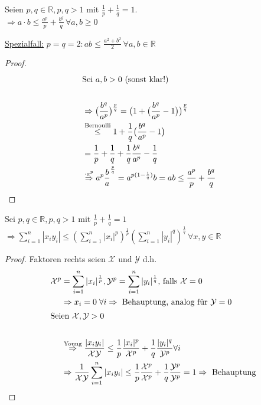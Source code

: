 \begin{proposition}
	Seien $p,q\in\mathbb{R}, p,q > 1$ mit $\frac{1}{p}+\frac{1}{q}=1$.\\
	$\Rightarrow a\cdot b \le \frac{a^p}{p} + \frac{b^q}{q}\,\forall a,b\ge 0$
	
	\uline{Spezialfall:} $p=q=2: ab \le \frac{a^2+b^2}{2} \,\forall a,b\in \mathbb{R}$
\end{proposition}
\begin{proof} %
	\begin{align*}
	\shortintertext{Sei $a,b > 0$ (sonst klar!)} \\
	&\Rightarrow \big(\frac{b^q}{a^p}\big)^{\frac{p}{q}} = \big(1+\big(\frac{b^q}{a^p} -1\big)\big)^{\frac{p}{q}}\\ 
	&\overset{\text{Bernoulli}}{\leq} 1+ \frac{1}{q}\big(\frac{b^q}{a^p} -1\big)\\ 
	&=\frac{1}{p}+\frac{1}{q}+\frac{1}{q}\frac{b^q}{a^p}-\frac{1}{q}\\
	&\overset{\cdot a^p}{\Rightarrow} a^p\frac{b}a^{\frac{p}{q}} = a^{p(1-\frac{1}{q})}b = ab \leq \frac{a^p}{p} + \frac{b^q}{q} 
	\end{align*}
\end{proof}

\begin{proposition}
	Sei $p,q\in\mathbb{R}, p,q > 1$ mit $\frac{1}{p} + \frac{1}{q} = 1$\\
	$\Rightarrow \sum\limits_{i=1}^{n} |x_i y_i| \le \left(\sum\limits_{i=1}^n |x_i|^p \right)^{\frac{1}{p}}\left(\sum\limits_{i=1}^n |y_i|^q\right)^{\frac{1}{q}}\,\forall x,y\in\mathbb{R}$
\end{proposition}
\begin{proof}
	Faktoren rechts seien $\mathcal{X} \text{ und } \mathcal{Y}$ d.h.
	\begin{align*}
	\mathcal{X}^p &= \sum\limits_{i=1}^{n} \vert x_i \vert^{\frac{1}{p}}, \mathcal{Y}^p = \sum\limits\limits_{i=1}^{n} \vert y_i \vert^{\frac{1}{q}}\text{, falls } \mathcal{X}=0\\ 
	&\Rightarrow x_i = 0\;\forall i \Rightarrow \text{ Behauptung} \text{, analog für } \mathcal{Y} =0\\
	\shortintertext{Seien $\mathcal{X}, \mathcal{Y} > 0$} \\
    &\overset{\text{Young}}{\Rightarrow} 
	\frac{\vert x_i y_i \vert}{\mathcal{XY}} \leq \frac{1}{p}\frac{\vert x_i \vert^p}{\mathcal{X}^p}+ \frac{1}{q}\frac{\vert y_i \vert^q}{\mathcal{Y}^p} \forall i\\
	&\Rightarrow \frac{1}{\mathcal{XY}}\sum\limits\limits_{i=1}^{n}\vert x_i y_i \vert \leq \frac{1}{p}\frac{\mathcal{X}^p}{\mathcal{X}^p}+\frac{1}{q}\frac{\mathcal{Y}^p}{\mathcal{Y}^p} = 1 \Rightarrow \text{ Behauptung}
	\end{align*}
\end{proof}

